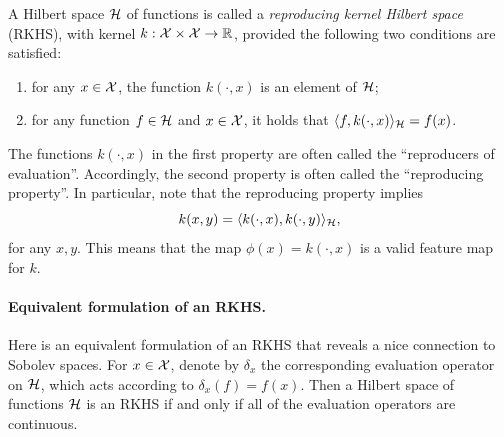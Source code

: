 \documentclass{article}
\begin{document}
A Hilbert space $\mathcal{H}$ of functions is called a \emph{reproducing kernel Hilbert
  space} (RKHS), with kernel $k : \mathcal{X} \times \mathcal{X} \to \mathbb{R}$, provided the following
two conditions are satisfied:  
\begin{enumerate}
\item for any $x \in \mathcal{X}$, the function $k(\cdot, x)$ is an element of $\mathcal{H}$;   
\item for any function $f \in \mathcal{H}$ and $x \in \mathcal{X}$, it holds that $\langle f,
  k(\cdot, x) \rangle_{\mathcal{H}} = f(x)$. 
\end{enumerate}
The functions $k(\cdot, x)$ in the first property are often called the
``reproducers of evaluation''. Accordingly, the second property is often called
the ``reproducing property''. In particular, note that the reproducing property
implies 
\[
k(x,y) = \langle k(\cdot, x), k(\cdot, y) \rangle_{\mathcal{H}},
\]
for any $x,y$. This means that the map $\phi(x) = k(\cdot, x)$ is a valid
feature map for $k$.  

\paragraph{Equivalent formulation of an RKHS.}

Here is an equivalent formulation of an RKHS that reveals a nice connection to
Sobolev spaces. For $x \in \mathcal{X}$, denote by $\delta_x$ the corresponding
evaluation operator on $\mathcal{H}$, which acts according to $\delta_x(f) = f(x)$. Then
a Hilbert space of functions $\mathcal{H}$ is an RKHS if and only if all of the
evaluation operators are continuous.  
\end{document}

